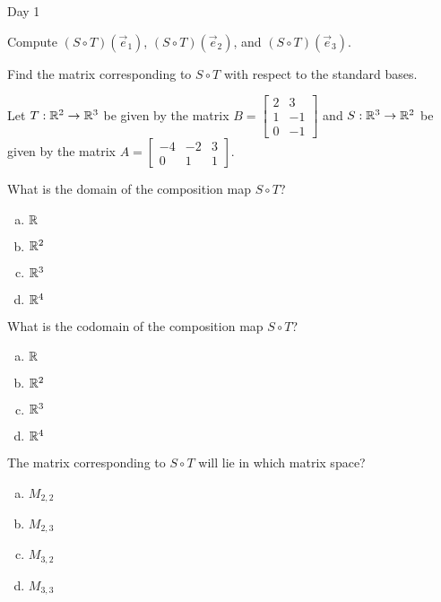 \begin{applicationActivities}{Day 1}
\begin{activity}
Compute $(S \circ T)(\vec{e}_1)$, $(S \circ T)(\vec{e}_2)$, and
$(S \circ T)(\vec{e}_3)$.
\end{activity}

\begin{activity}
Find the matrix corresponding to $S \circ T$ with respect to the standard bases.
\end{activity}

\begin{activity}
Let $T: \mathbb{R}^2 \rightarrow \mathbb{R}^3$ be given by the matrix $B=\begin{bmatrix} 2 & 3 \\ 1 & -1 \\ 0 & -1 \end{bmatrix}$ and $S: \mathbb{R}^3 \rightarrow \mathbb{R}^2$ be given by the matrix $A=\begin{bmatrix} -4 & -2 & 3 \\ 0 & 1 & 1 \end{bmatrix}$.

What is the domain of the composition map $S \circ T$?
\begin{enumerate}[(a)]
\item $\mathbb{R}$
\item $\mathbb{R}^2$
\item $\mathbb{R}^3$
\item $\mathbb{R}^4$
\end{enumerate}
\end{activity}

\begin{activity}
What is the codomain of the composition map $S \circ T$?
\begin{enumerate}[(a)]
\item $\mathbb{R}$
\item $\mathbb{R}^2$
\item $\mathbb{R}^3$
\item $\mathbb{R}^4$
\end{enumerate}
\end{activity}

\begin{activity}
The matrix corresponding to $S \circ T$ will lie in which matrix space?
\begin{enumerate}[(a)]
\item $M_{2,2}$
\item $M_{2,3}$
\item $M_{3,2}$
\item $M_{3,3}$
\end{enumerate}
\end{activity}


\end{applicationActivities}
